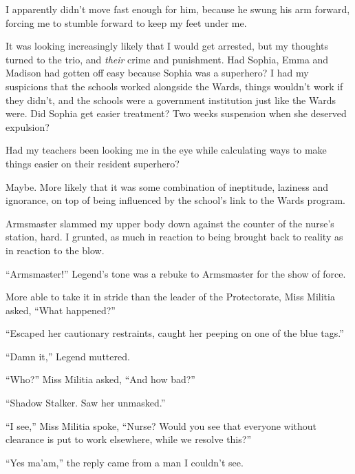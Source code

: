 I apparently didn't move fast enough for him, because he swung his arm forward, forcing me to stumble forward to keep my feet under me.



It was looking increasingly likely that I would get arrested, but my thoughts turned to the trio, and \emph{their} crime and punishment.  Had Sophia, Emma and Madison had gotten off easy because Sophia was a superhero?  I had my suspicions that the schools worked alongside the Wards, things wouldn't work if they didn't, and the schools were a government institution just like the Wards were.  Did Sophia get easier treatment?  Two weeks suspension when she deserved expulsion?



Had my teachers been looking me in the eye while calculating ways to make things easier on their resident superhero?



Maybe.  More likely that it was some combination of ineptitude, laziness and ignorance, on top of being influenced by the school's link to the Wards program.



Armsmaster slammed my upper body down against the counter of the nurse's station, hard.  I grunted, as much in reaction to being brought back to reality as in reaction to the blow.



``Armsmaster!'' Legend's tone was a rebuke to Armsmaster for the show of force.



More able to take it in stride than the leader of the Protectorate, Miss Militia asked, ``What happened?''



``Escaped her cautionary restraints, caught her peeping on one of the blue tags.''



``Damn it,'' Legend muttered.



``Who?'' Miss Militia asked, ``And how bad?''



``Shadow Stalker.  Saw her unmasked.''



``I see,'' Miss Militia spoke, ``Nurse?  Would you see that everyone without clearance is put to work elsewhere, while we resolve this?''



``Yes ma'am,'' the reply came from a man I couldn't see.



